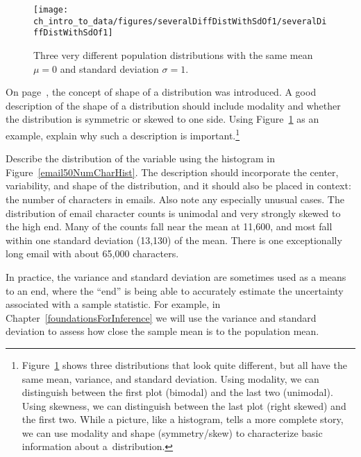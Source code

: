 \begin{figure}
\centering
\texttt{[image: ch\_intro\_to\_data/figures/severalDiffDistWithSdOf1/severalDiffDistWithSdOf1]}
\caption{Three very different population distributions with the same mean $\mu=0$ and standard deviation $\sigma=1$.}
\label{severalDiffDistWithSdOf1}
\end{figure}

\begin{exercise}
On page~\pageref{shapeFirstDiscussed}, the concept of shape of a distribution was introduced. A good description of the shape of a distribution should include modality and whether the distribution is symmetric or skewed to one side. Using Figure~\ref{severalDiffDistWithSdOf1} as an example, explain why such a description is important.\footnote{Figure~\ref{severalDiffDistWithSdOf1} shows three distributions that look quite different, but all have the same mean, variance, and standard deviation. Using modality, we can distinguish between the first plot (bimodal) and the last two (unimodal). Using skewness, we can distinguish between the last plot (right skewed) and the first two. While a picture, like a histogram, tells a more complete story, we can use modality and shape (symmetry/skew) to characterize basic information about a~distribution.}
\end{exercise}

\begin{example}{Describe the distribution of the  variable using the histogram in Figure~\vref{email50NumCharHist}. The description should incorporate the center, variability, and shape of the distribution, and it should also be placed in context: the number of characters in emails. Also note any especially unusual cases.}
The distribution of email character counts is unimodal and very strongly skewed to the high end. Many of the counts fall near the mean at 11,600, and most fall within one standard deviation (13,130) of the mean. There is one exceptionally long email with about 65,000 characters.
\end{example}

In practice, the variance and standard deviation are sometimes used as a means to an end, where the ``end'' is being able to accurately estimate the uncertainty associated with a sample statistic. For example, in Chapter~\ref{foundationsForInference} we will use the variance and standard deviation to assess how close the sample mean is to the population mean.

